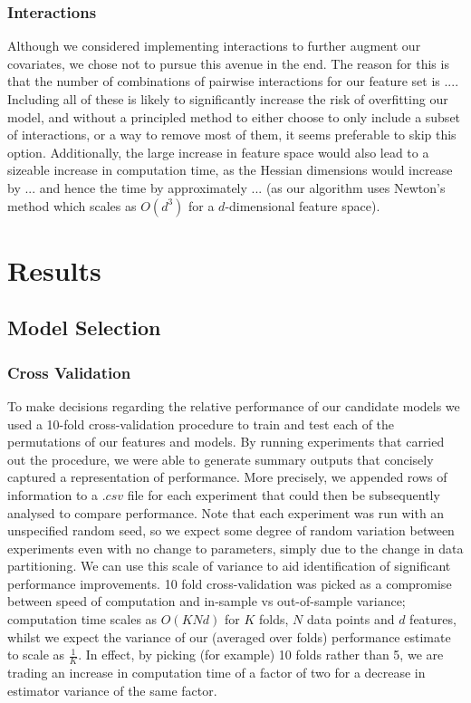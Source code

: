 \subsubsection{Interactions}
Although we considered implementing interactions to further augment our covariates, we chose not to pursue this avenue in the end. The reason for this is that the number of combinations of pairwise interactions for our feature set is .... Including all of these is likely to significantly increase the risk of overfitting our model, and without a principled method to either choose to only include a subset of interactions, or a way to remove most of them, it seems preferable to skip this option. Additionally, the large increase in feature space would also lead to a sizeable increase in computation time, as the Hessian dimensions would increase by ... and hence the time by approximately ... (as our algorithm uses Newton's method which scales as $O(d^3)$ for a $d$-dimensional feature space).

\section{Results}
\label{results}

\subsection{Model Selection}

\subsubsection{Cross Validation}
To make decisions regarding the relative performance of our candidate models we used a 10-fold cross-validation procedure to train and test each of the permutations of our features and models. By running experiments that carried out the procedure, we were able to generate summary outputs that concisely captured a representation of performance. More precisely, we appended rows of information to a $.csv$ file for each experiment that could then be subsequently analysed to compare performance. Note that each experiment was run with an unspecified random seed, so we expect some degree of random variation between experiments even with no change to parameters, simply due to the change in data partitioning. We can use this scale of variance to aid identification of significant performance improvements. 10 fold cross-validation was picked as a compromise between speed of computation and in-sample vs out-of-sample variance; computation time scales as $O(KNd)$ for $K$ folds, $N$ data points and $d$ features, whilst we expect the variance of our (averaged over folds) performance estimate to scale as $\frac{1}{K}$. In effect, by picking (for example) 10 folds rather than 5, we are trading an increase in computation time of a factor of two for a decrease in estimator variance of the same factor. 

